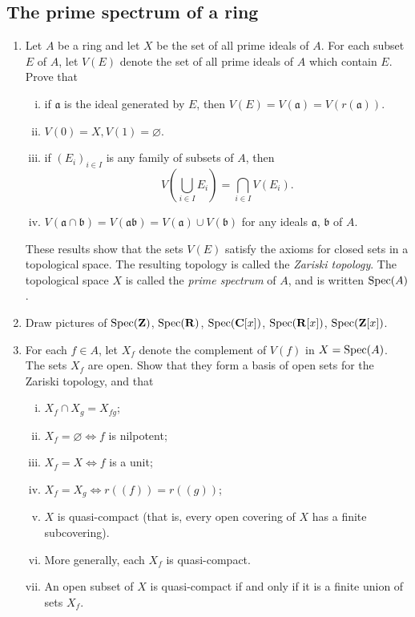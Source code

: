 \documentclass[class=book, crop=false]{standalone}
\theoremstyle{definition}
\theoremstyle{remark}
\begin{document}
\subsection*{The prime spectrum of a ring}
\begin{enumerate}[resume*=exc1]
  \item Let $A$ be a ring and let $X$ be the set of all prime ideals of $A$. For
        each subset $E$ of $A$, let $V(E)$ denote the set of all prime ideals of
        $A$ which contain $E$. Prove that
        \begin{enumerate}[i)]
          \item if $\mathfrak{a}$ is the ideal generated by $E$, then
$V(E)=V(\mathfrak{a})=V(r(\mathfrak{a}))$.
          \item $V(0)=X, V(1)=\varnothing$.
          \item if $\left(E_{i}\right)_{i \in I}$ is any family of subsets of $A$, then
\[
  V\left(\bigcup_{i \in I} E_{i}\right)=\bigcap_{i \in I} V\left(E_{i}\right).
\]
          \item $V(\mathfrak{a} \cap \mathfrak{b})=V(\mathfrak{a} \mathfrak{b})=V(\mathfrak{a}) \cup V(\mathfrak{b})$
for any ideals $\mathfrak{a}$, $\mathfrak{b}$ of $A$.
        \end{enumerate}

These results show that the sets $V(E)$ satisfy the axioms for closed sets in a
topological space. The resulting topology is called the \textit{Zariski topology}. The
topological space $X$ is called the \textit{prime spectrum} of $A$, and is written
$\operatorname{Spec}(A)$.

  \item Draw pictures of $\operatorname{Spec}(\mathbf{Z})$, $\operatorname{Spec}(\mathbf{R})$, $\operatorname{Spec}(\mathbf{C}[x])$, $\operatorname{Spec}(\mathbf{R}[x])$, $\operatorname{Spec}(\mathbf{Z}[x])$.

  \item For each $f \in A$, let $X_{f}$ denote the complement of $V(f)$ in
        $X=\operatorname{Spec}(A)$. The sets $X_{f}$ are open. Show that they
        form a basis of open sets for the Zariski topology, and that
\begin{enumerate}[i)]
  \item $X_{f} \cap X_{g}=X_{f g}$;
  \item $X_{f}=\varnothing \iff f$ is nilpotent;
  \item $X_{f}=X \iff f$ is a unit;
  \item $X_{f}=X_{g} \iff r((f))=r((g))$;
  \item $X$ is quasi-compact (that is, every open covering of $X$ has a finite
subcovering).
  \item More generally, each $X_{f}$ is quasi-compact.
  \item An open subset of $X$ is quasi-compact if and only if it is a finite union
of sets $X_{f}$.


\end{enumerate}
\end{enumerate}
\end{document}
